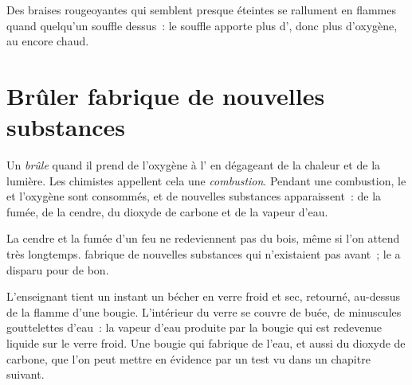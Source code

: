 \begin{example}\label{ex:g4:what-a-fire-needs:embers}
Des braises rougeoyantes qui semblent presque éteintes se rallument en
flammes quand quelqu'un souffle dessus~: le souffle apporte plus d',
donc plus d'oxygène, au  encore chaud.
\end{example}

\section{Brûler fabrique de nouvelles substances}

\begin{definition}\label{def:g4:what-a-fire-needs:burning}
Un  \emph{brûle} quand il prend de l'oxygène à
l' en dégageant de la chaleur et de la lumière. Les chimistes
appellent cela une \emph{combustion}. Pendant une
combustion, le  et l'oxygène sont consommés, et de nouvelles
substances apparaissent~: de la fumée, de la cendre, du dioxyde de
carbone et de la vapeur d'eau.
\end{definition}

\begin{proposition}\label{prop:g4:what-a-fire-needs:new}
La cendre et la fumée d'un feu ne redeviennent pas du bois, même si
l'on attend très longtemps.  fabrique de nouvelles substances qui
n'existaient pas avant~; le  a disparu pour de bon.
\end{proposition}

\begin{inthelab}
L'enseignant tient un instant un bécher en verre froid et sec, retourné,
au-dessus de la flamme d'une bougie. L'intérieur du verre se couvre de
buée, de minuscules gouttelettes d'eau~: la vapeur d'eau produite par la
bougie qui  est redevenue liquide sur le verre froid. Une bougie
qui  fabrique de l'eau, et aussi du dioxyde de carbone, que l'on
peut mettre en évidence par un test vu dans un chapitre suivant.
\end{inthelab}

